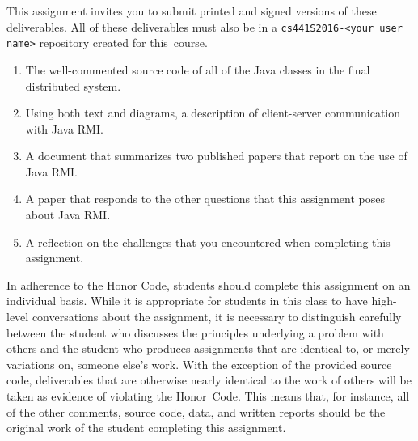 This assignment invites you to submit printed and signed versions of these deliverables. All of these deliverables must
also be in a {\tt cs441S2016-<your user name>} repository created for \mbox{this course}.

\vspace*{-.1in}

\begin{enumerate}
  \itemsep 0em

  \item The well-commented source code of all of the Java classes in the final distributed system.

  \item Using both text and diagrams, a description of client-server communication with Java RMI.

  \item A document that summarizes two published papers that report on the use of Java RMI.

  \item A paper that responds to the other questions that this assignment poses about Java RMI.

  \item A reflection on the challenges that you encountered when completing this assignment.

\end{enumerate}

\vspace*{-.1in}


In adherence to the Honor Code, students should complete this assignment on an individual basis. While it is appropriate
for students in this class to have high-level conversations about the assignment, it is necessary to distinguish
carefully between the student who discusses the principles underlying a problem with others and the student who produces
assignments that are identical to, or merely variations on, someone else's work.  With the exception of the provided
source code, deliverables that are otherwise nearly identical to the work of others will be taken as evidence of
violating the \mbox{Honor Code}. This means that, for instance, all of the other comments, source code, data, and
written reports should be the original work of the student completing this assignment.



